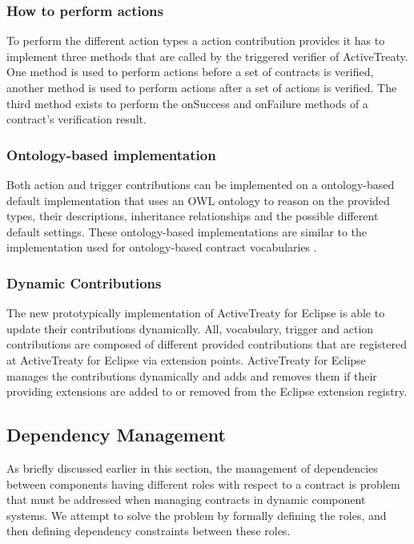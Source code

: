 \documentclass{llncs}
\begin{document}
\subsubsection{How to perform actions}

To perform the different action types a action contribution provides it has to implement three methods that are called by the triggered verifier of ActiveTreaty. One method is used to perform actions before a set of contracts is verified, another method is used to perform actions after a set of actions is verified. The third method exists to perform the onSuccess and onFailure methods of a contract's verification result.

\subsubsection{Ontology-based implementation}

Both action and trigger contributions can be implemented on a ontology-based default implementation that uses an OWL ontology to reason on the provided types, their descriptions, inheritance relationships and the possible different default settings. These ontology-based implementations are similar to the implementation used for ontology-based contract vocabularies \cite{Treaty.JOT2009}.

\subsubsection{Dynamic Contributions}

The new prototypically implementation of ActiveTreaty for Eclipse is able to update their contributions dynamically. All, vocabulary, trigger and action contributions are composed of different provided contributions that are registered at ActiveTreaty for Eclipse via extension points. ActiveTreaty for Eclipse manages the contributions dynamically and adds and removes them if their providing extensions are added to or removed from the Eclipse extension registry.



\subsection{Dependency Management}

As briefly discussed earlier in this section, the management of dependencies between components having different roles with respect to a contract is problem that must be addressed when managing contracts in dynamic component systems. We attempt to solve the problem by formally defining the roles, and then defining dependency constraints between these roles. 
\end{document}

